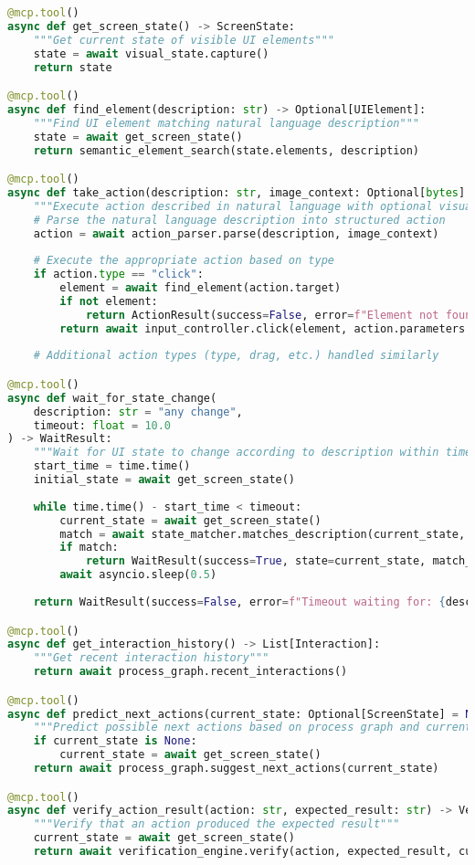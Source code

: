 \documentclass{article}
\begin{document}
\begin{lstlisting}[language=Python]
@mcp.tool()
async def get_screen_state() -> ScreenState:
    """Get current state of visible UI elements"""
    state = await visual_state.capture()
    return state

@mcp.tool()
async def find_element(description: str) -> Optional[UIElement]:
    """Find UI element matching natural language description"""
    state = await get_screen_state()
    return semantic_element_search(state.elements, description)

@mcp.tool()
async def take_action(description: str, image_context: Optional[bytes] = None) -> ActionResult:
    """Execute action described in natural language with optional visual context"""
    # Parse the natural language description into structured action
    action = await action_parser.parse(description, image_context)
    
    # Execute the appropriate action based on type
    if action.type == "click":
        element = await find_element(action.target)
        if not element:
            return ActionResult(success=False, error=f"Element not found: {action.target}")
        return await input_controller.click(element, action.parameters.get("click_type", "single"))
    
    # Additional action types (type, drag, etc.) handled similarly

@mcp.tool()
async def wait_for_state_change(
    description: str = "any change", 
    timeout: float = 10.0
) -> WaitResult:
    """Wait for UI state to change according to description within timeout"""
    start_time = time.time()
    initial_state = await get_screen_state()
    
    while time.time() - start_time < timeout:
        current_state = await get_screen_state()
        match = await state_matcher.matches_description(current_state, description, initial_state)
        if match:
            return WaitResult(success=True, state=current_state, match_details=match)
        await asyncio.sleep(0.5)
    
    return WaitResult(success=False, error=f"Timeout waiting for: {description}")

@mcp.tool()
async def get_interaction_history() -> List[Interaction]:
    """Get recent interaction history"""
    return await process_graph.recent_interactions()

@mcp.tool()
async def predict_next_actions(current_state: Optional[ScreenState] = None) -> List[ActionPrediction]:
    """Predict possible next actions based on process graph and current state"""
    if current_state is None:
        current_state = await get_screen_state()
    return await process_graph.suggest_next_actions(current_state)

@mcp.tool()
async def verify_action_result(action: str, expected_result: str) -> VerificationResult:
    """Verify that an action produced the expected result"""
    current_state = await get_screen_state()
    return await verification_engine.verify(action, expected_result, current_state)
\end{lstlisting}
\end{document}
